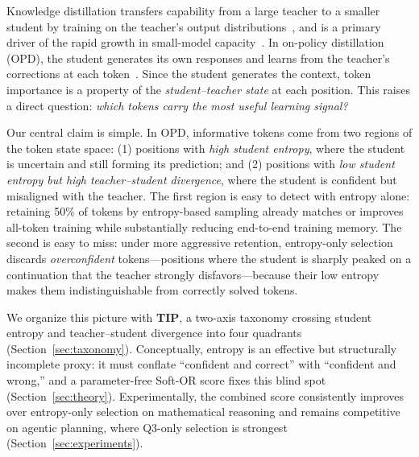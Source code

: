 \documentclass{article}
\begin{document}
Knowledge distillation transfers capability from a large teacher to a smaller student by training on the teacher's output distributions~\citep{hinton2015distilling}, and is a primary driver of the rapid growth in small-model capacity~\citep{xiao2024densing}.
In on-policy distillation (OPD), the student generates its own responses and learns from the teacher's corrections at each token~\citep{agarwal2024gkd,gu2024minillm}.
Since the student generates the context, token importance is a property of the \emph{student--teacher state} at each position.
This raises a direct question: \emph{which tokens carry the most useful learning signal?}

Our central claim is simple.
In OPD, informative tokens come from two regions of the token state space:
(1) positions with \emph{high student entropy}, where the student is uncertain and still forming its prediction;
and (2) positions with \emph{low student entropy but high teacher--student divergence}, where the student is confident but misaligned with the teacher.
The first region is easy to detect with entropy alone: retaining 50\% of tokens by entropy-based sampling already matches or improves all-token training while substantially reducing end-to-end training memory.
The second is easy to miss: under more aggressive retention, entropy-only selection discards \emph{overconfident} tokens---positions where the student is sharply peaked on a continuation that the teacher strongly disfavors---because their low entropy makes them indistinguishable from correctly solved tokens.

We organize this picture with \textbf{TIP}, a two-axis taxonomy crossing student entropy and teacher--student divergence into four quadrants (Section~\ref{sec:taxonomy}).
Conceptually, entropy is an effective but structurally incomplete proxy: it must conflate ``confident and correct'' with ``confident and wrong,'' and a parameter-free Soft-OR score fixes this blind spot (Section~\ref{sec:theory}).
Experimentally, the combined score consistently improves over entropy-only selection on mathematical reasoning and remains competitive on agentic planning, where Q3-only selection is strongest (Section~\ref{sec:experiments}).
\end{document}
